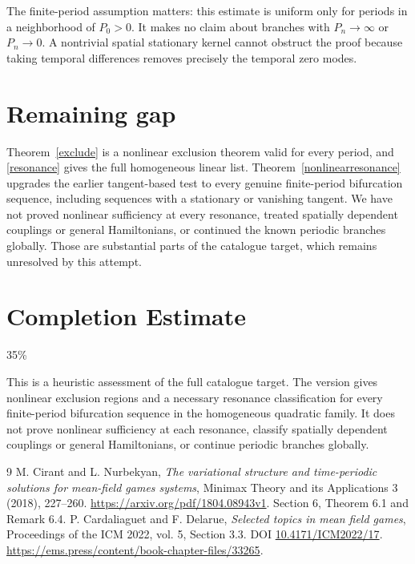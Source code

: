 \documentclass[11pt]{article}
\begin{document}
The finite-period assumption matters: this estimate is uniform only for
periods in a neighborhood of $P_0>0$. It makes no claim about branches
with $P_n\to\infty$ or $P_n\to0$. A nontrivial spatial stationary
kernel cannot obstruct the proof because taking temporal differences
removes precisely the temporal zero modes.

\section{Remaining gap}
Theorem~\ref{exclude} is a nonlinear exclusion theorem valid for every
period, and \eqref{resonance} gives the full homogeneous linear list.
Theorem~\ref{nonlinearresonance} upgrades the earlier tangent-based test
to every genuine finite-period bifurcation sequence, including sequences
with a stationary or vanishing tangent. We have not proved nonlinear sufficiency
at every resonance, treated spatially dependent couplings or general
Hamiltonians, or continued the known periodic branches globally.
Those are substantial parts of the catalogue target, which remains
unresolved by this attempt.

\section{Completion Estimate}
35\%

This is a heuristic assessment of the full catalogue target. The version gives nonlinear exclusion regions and a necessary resonance classification for every finite-period bifurcation sequence in the homogeneous quadratic family. It does not prove nonlinear sufficiency at each resonance, classify spatially dependent couplings or general Hamiltonians, or continue periodic branches globally.

\begin{thebibliography}{9}
 M. Cirant and L. Nurbekyan,
\emph{The variational structure and time-periodic solutions for mean-field games systems},
Minimax Theory and its Applications 3 (2018), 227--260.
\url{https://arxiv.org/pdf/1804.08943v1}. Section 6, Theorem 6.1 and Remark 6.4.
 P. Cardaliaguet and F. Delarue,
\emph{Selected topics in mean field games}, Proceedings of the ICM 2022,
vol. 5, Section 3.3. DOI \href{https://doi.org/10.4171/ICM2022/17}{10.4171/ICM2022/17}.
\url{https://ems.press/content/book-chapter-files/33265}.
\end{thebibliography}
\end{document}
